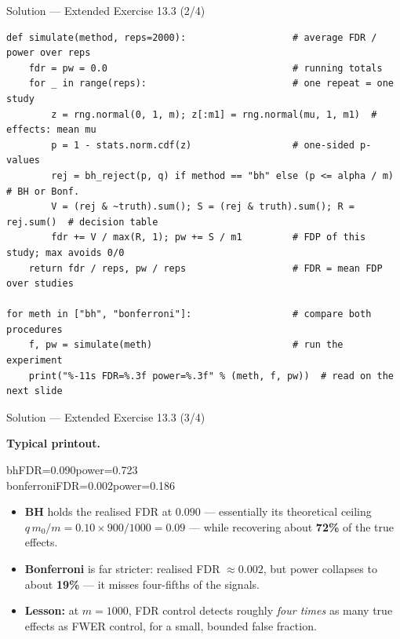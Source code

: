 \documentclass[aspectratio=169,11pt]{beamer}
\begin{document}
\begin{frame}[fragile]{Solution --- Extended Exercise 13.3 (2/4)}
\begin{solutionbox}
\begin{lstlisting}[basicstyle=\ttfamily\scriptsize]
def simulate(method, reps=2000):                   # average FDR / power over reps
    fdr = pw = 0.0                                 # running totals
    for _ in range(reps):                          # one repeat = one study
        z = rng.normal(0, 1, m); z[:m1] = rng.normal(mu, 1, m1)  # effects: mean mu
        p = 1 - stats.norm.cdf(z)                  # one-sided p-values
        rej = bh_reject(p, q) if method == "bh" else (p <= alpha / m)  # BH or Bonf.
        V = (rej & ~truth).sum(); S = (rej & truth).sum(); R = rej.sum()  # decision table
        fdr += V / max(R, 1); pw += S / m1         # FDP of this study; max avoids 0/0
    return fdr / reps, pw / reps                   # FDR = mean FDP over studies

for meth in ["bh", "bonferroni"]:                  # compare both procedures
    f, pw = simulate(meth)                         # run the experiment
    print("%-11s FDR=%.3f power=%.3f" % (meth, f, pw))  # read on the next slide
\end{lstlisting}
\end{solutionbox}
\end{frame}

\begin{frame}{Solution --- Extended Exercise 13.3 (3/4)}
\begin{solutionbox}
  \textbf{Typical printout.}
  \begin{center}\ttfamily\footnotesize
  bh\quad FDR=0.090\quad power=0.723\\[2pt]
  bonferroni\quad FDR=0.002\quad power=0.186
  \end{center}
  \begin{itemize}
    \item \textbf{BH} holds the realised FDR at $0.090$ --- essentially its theoretical
          ceiling $q\,m_0/m=0.10\times900/1000=0.09$ --- while recovering about
          \textbf{72\%} of the true effects.
    \item \textbf{Bonferroni} is far stricter: realised FDR $\approx0.002$, but power
          collapses to about \textbf{19\%} --- it misses four-fifths of the signals.
    \item \textbf{Lesson:} at $m=1000$, FDR control detects roughly \emph{four times} as
          many true effects as FWER control, for a small, bounded false fraction.
  \end{itemize}
\end{solutionbox}
\end{frame}
\end{document}
